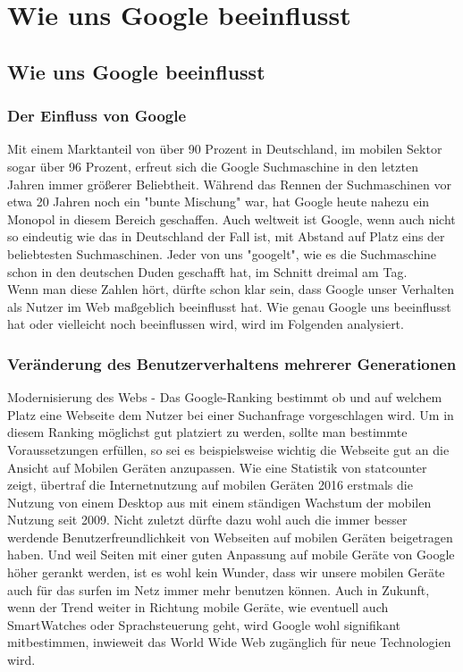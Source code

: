 \documentclass[11pt]{report}
\begin{document}
    \chapter{Wie uns Google beeinflusst}\label{ch:wie-uns-google-beeinflusst}


    \section{Wie uns Google beeinflusst}\label{sec:wie-uns-google-beeinflusst}

    \subsection{Der Einfluss von Google}\label{subsec:der-einfluss-von-google}
    Mit einem Marktanteil von über 90 Prozent in Deutschland, im mobilen Sektor sogar über 96 Prozent, erfreut sich die Google Suchmaschine in den letzten Jahren immer größerer Beliebtheit.
    Während das Rennen der Suchmaschinen vor etwa 20 Jahren noch ein "bunte Mischung" war, hat Google heute nahezu ein Monopol in diesem Bereich geschaffen.
    Auch weltweit ist Google, wenn auch nicht so eindeutig wie das in Deutschland der Fall ist, mit Abstand auf Platz eins der beliebtesten Suchmaschinen.
    Jeder von uns "googelt"\cite{[DUD22]}, wie es die Suchmaschine schon in den deutschen Duden geschafft hat, im Schnitt dreimal am Tag.\cite{[DOL22]}\\
    Wenn man diese Zahlen hört, dürfte schon klar sein, dass Google unser Verhalten als Nutzer im Web maßgeblich beeinflusst hat.
    Wie genau Google uns beeinflusst hat oder vielleicht noch beeinflussen wird, wird im Folgenden analysiert.

    \subsection{Veränderung des Benutzerverhaltens mehrerer Generationen}\label{subsec:veränderung-des-benutzerverhaltens-mehrerer-generationen}
    Modernisierung des Webs - Das Google-Ranking bestimmt ob und auf welchem Platz eine Webseite dem Nutzer bei einer Suchanfrage vorgeschlagen wird.
    Um in diesem Ranking möglichst gut platziert zu werden, sollte man bestimmte Voraussetzungen erfüllen, so sei es beispielsweise wichtig die Webseite gut an die Ansicht auf Mobilen Geräten anzupassen.\cite{[BUI22]}
    Wie eine Statistik von statcounter zeigt, übertraf die Internetnutzung auf mobilen Geräten 2016 erstmals die Nutzung von einem Desktop aus mit einem ständigen Wachstum der mobilen Nutzung seit 2009.\cite{[STA16]}
    Nicht zuletzt dürfte dazu wohl auch die immer besser werdende Benutzerfreundlichkeit von Webseiten auf mobilen Geräten beigetragen haben.
    Und weil Seiten mit einer guten Anpassung auf mobile Geräte von Google höher gerankt werden, ist es wohl kein Wunder, dass wir unsere mobilen Geräte auch für das surfen im Netz immer mehr benutzen können.
    Auch in Zukunft, wenn der Trend weiter in Richtung mobile Geräte, wie eventuell auch SmartWatches oder Sprachsteuerung geht, wird Google wohl signifikant mitbestimmen, inwieweit das World Wide Web zugänglich für neue Technologien wird.\\
\end{document}
